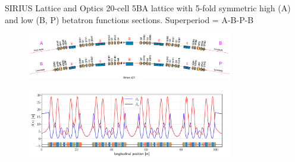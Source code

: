 \documentclass[aspectratio=169]{beamer}
\begin{document}
\begin{frame}{SIRIUS Lattice and Optics}
    20-cell 5BA lattice with 5-fold symmetric high (A) and low (B, P) betatron functions sections. Superperiod = A-B-P-B
    \begin{figure}
        \centering
        \includegraphics[width=0.8\textwidth]{SI_superperiod.png}
    \end{figure}
    \begin{figure}
        \includegraphics[width=0.8\textwidth]{beta_functions.pdf}
    \end{figure}
\end{frame}
\end{document}
